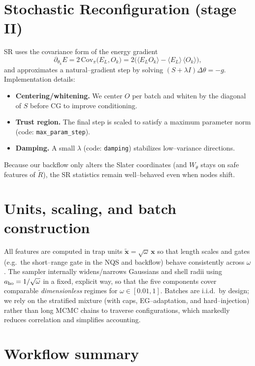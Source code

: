 \section{Stochastic Reconfiguration (stage II)}
\label{sec:sr-stage}

SR uses the covariance form of the energy gradient
\begin{equation}
\partial_{\theta_k}E 
= 2\,\mathrm{Cov}_\pi\!\big(E_L, O_k\big)
= 2\Big(\langle E_L O_k\rangle - \langle E_L\rangle\,\langle O_k\rangle\Big),
\end{equation}
and approximates a natural–gradient step by solving $(S+\lambda I)\Delta\theta=-g$.
Implementation details:
\begin{itemize}
  \item \textbf{Centering/whitening.} We center $O$ per batch and whiten by the diagonal of $S$ before CG to improve conditioning.
  \item \textbf{Trust region.} The final step is scaled to satisfy a maximum parameter norm (code: \texttt{max\_param\_step}).
  \item \textbf{Damping.} A small $\lambda$ (code: \texttt{damping}) stabilizes low–variance directions.
\end{itemize}
Because our backflow only alters the Slater coordinates (and $W_\theta$ stays on safe features of $\tilde R$), the SR statistics remain well–behaved even when nodes shift.

\section{Units, scaling, and batch construction}
\label{sec:units-scaling}

All features are computed in trap units $\tilde{\mathbf x}=\sqrt{\omega}\,\mathbf x$ so that length scales and gates (e.g.\ the short–range gate in the NQS and backflow) behave consistently across $\omega$. The sampler internally widens/narrows Gaussians and shell radii using $a_{\rm ho}=1/\sqrt{\omega}$ in a fixed, explicit way, so that the five components cover comparable \emph{dimensionless} regimes for $\omega\in[0.01,1]$. Batches are i.i.d.\ by design; we rely on the stratified mixture (with caps, EG–adaptation, and hard–injection) rather than long MCMC chains to traverse configurations, which markedly reduces correlation and simplifies accounting.

\section{Workflow summary}
\label{sec:opt-summary}

